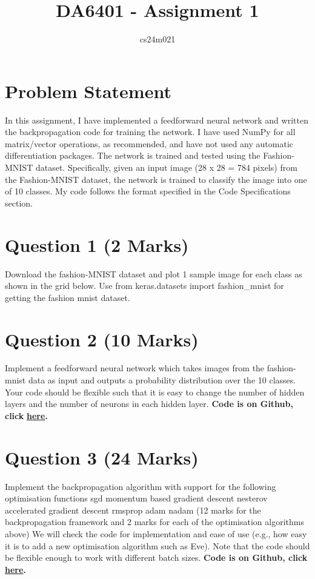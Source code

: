 \documentclass{article}
\title{DA6401 - Assignment 1}
\author{%
cs24m021
}
\begin{document}
\maketitle

\section{Problem Statement}
In this assignment, I have implemented a feedforward neural network and written the backpropagation code for training the network. I have used NumPy for all matrix/vector operations, as recommended, and have not used any automatic differentiation packages. The network is trained and tested using the Fashion-MNIST dataset. Specifically, given an input image (28 x 28 = 784 pixels) from the Fashion-MNIST dataset, the network is trained to classify the image into one of 10 classes. My code follows the format specified in the Code Specifications section.

\section{Question 1 (2 Marks)}
Download the fashion-MNIST dataset and plot 1 sample image for each class as shown in the grid below. Use from keras.datasets import fashion_mnist for getting the fashion mnist dataset.
\section{Question 2 (10 Marks)}
Implement a feedforward neural network which takes images from the fashion-mnist data as input and outputs a probability distribution over the 10 classes.
Your code should be flexible such that it is easy to change the number of hidden layers and the number of neurons in each hidden layer.
\textbf{Code is on Github, click }\href{https://github.com/karan757527/DA6401/blob/main/Question_Wise/Question2.py}{\textbf{here}}\textbf{.}

\section{Question 3 (24 Marks)}
Implement the backpropagation algorithm with support for the following optimisation functions 
sgd
momentum based gradient descent
nesterov accelerated gradient descent
rmsprop
adam
nadam
(12 marks for the backpropagation framework and 2 marks for each of the optimisation algorithms above)
We will check the code for implementation and ease of use (e.g., how easy it is to add a new optimisation algorithm such as Eve). Note that the code should be flexible enough to work with different batch sizes.
\textbf{Code is on Github, click }\href{https://github.com/karan757527/DA6401/blob/main/Question_Wise/Question3.py}{\textbf{here}}\textbf{.}
\end{document}
